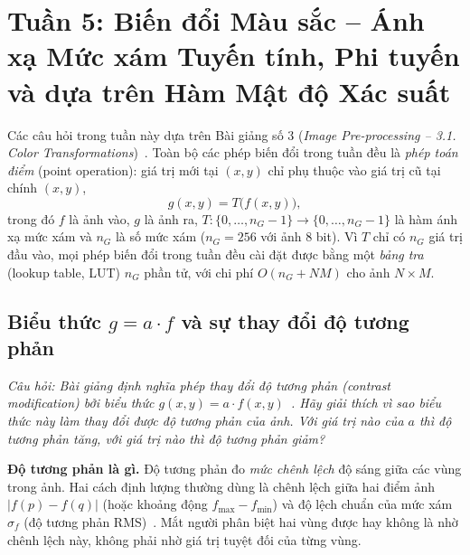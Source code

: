 \section{Tuần 5: Biến đổi Màu sắc -- Ánh xạ Mức xám Tuyến tính, Phi tuyến và dựa trên Hàm Mật độ Xác suất}
\label{sec:week5}

Các câu hỏi trong tuần này dựa trên Bài giảng số 3 (\emph{Image Pre-processing -- 3.1. Color Transformations})~\citep{xlav_lec3}. Toàn bộ các phép biến đổi trong tuần đều là \emph{phép toán điểm} (point operation): giá trị mới tại $(x, y)$ chỉ phụ thuộc vào giá trị cũ tại chính $(x, y)$,
\begin{equation}
g(x, y) = T\big(f(x, y)\big),
\label{eq:w5_point_op}
\end{equation}
trong đó $f$ là ảnh vào, $g$ là ảnh ra, $T: \{0, \ldots, n_G - 1\} \rightarrow \{0, \ldots, n_G - 1\}$ là hàm ánh xạ mức xám và $n_G$ là số mức xám ($n_G = 256$ với ảnh 8 bit). Vì $T$ chỉ có $n_G$ giá trị đầu vào, mọi phép biến đổi trong tuần đều cài đặt được bằng một \emph{bảng tra} (lookup table, LUT) $n_G$ phần tử, với chi phí $O(n_G + NM)$ cho ảnh $N \times M$.

\subsection{Biểu thức \texorpdfstring{$g = a \cdot f$}{g = a f} và sự thay đổi độ tương phản}
\label{subsec:w5_contrast}

\textit{Câu hỏi: Bài giảng định nghĩa phép thay đổi độ tương phản (contrast modification) bởi biểu thức $g(x, y) = a \cdot f(x, y)$~\citep{xlav_lec3}. Hãy giải thích vì sao biểu thức này làm thay đổi được độ tương phản của ảnh. Với giá trị nào của $a$ thì độ tương phản tăng, với giá trị nào thì độ tương phản giảm?}

\textbf{Độ tương phản là gì.} Độ tương phản đo \emph{mức chênh lệch} độ sáng giữa các vùng trong ảnh. Hai cách định lượng thường dùng là chênh lệch giữa hai điểm ảnh $|f(p) - f(q)|$ (hoặc khoảng động $f_{\max} - f_{\min}$) và độ lệch chuẩn của mức xám $\sigma_f$ (độ tương phản RMS)~\citep{gonzalez2018digital}. Mắt người phân biệt hai vùng được hay không là nhờ chênh lệch này, không phải nhờ giá trị tuyệt đối của từng vùng.


